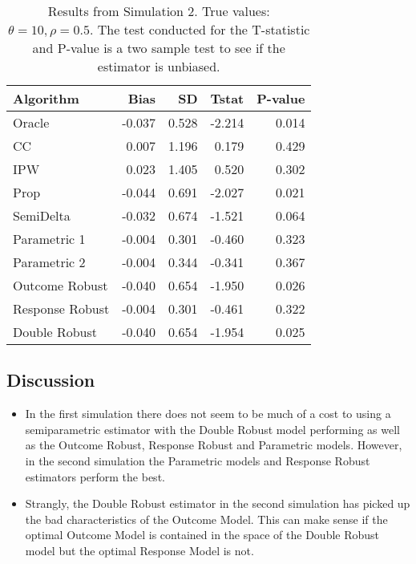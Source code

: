 \documentclass[12pt]{article}
\begin{document}
\begin{table}[ht!]
  \caption{Results from Simulation 2. True values: $\theta = 10, \rho = 0.5$.
  The test conducted for the T-statistic and P-value is a two sample test to 
  see if the estimator is unbiased.}
  \label{tab:sim2}
  \centering
  \begin{tabular}[t]{lrrrr}
    \toprule
    Algorithm & Bias & SD & Tstat & P-value\\
    \midrule
    Oracle & -0.037 & 0.528 & -2.214 & 0.014\\
    CC & 0.007 & 1.196 & 0.179 & 0.429\\
    IPW & 0.023 & 1.405 & 0.520 & 0.302\\
    Prop & -0.044 & 0.691 & -2.027 & 0.021\\
    SemiDelta & -0.032 & 0.674 & -1.521 & 0.064\\
    Parametric 1 & -0.004 & 0.301 & -0.460 & 0.323\\
    Parametric 2 & -0.004 & 0.344 & -0.341 & 0.367\\
    Outcome Robust & -0.040 & 0.654 & -1.950 & 0.026\\
    Response Robust & -0.004 & 0.301 & -0.461 & 0.322\\
    Double Robust & -0.040 & 0.654 & -1.954 & 0.025\\
    \bottomrule
  \end{tabular}
\end{table}


\newpage

\subsection*{Discussion}

\begin{itemize}
  \item In the first simulation there does not seem to be much of a cost 
    to using a semiparametric estimator with the Double Robust model 
    performing as well as the Outcome Robust, Response Robust and 
    Parametric models. However, in the second simulation the Parametric 
    models and Response Robust estimators perform the best.
  \item Strangly, the Double Robust estimator in the second simulation 
    has picked up the bad characteristics of the Outcome Model. This 
    can make sense if the optimal Outcome Model is contained in the 
    space of the Double Robust model but the optimal Response Model 
    is not.
\end{itemize}
\end{document}
